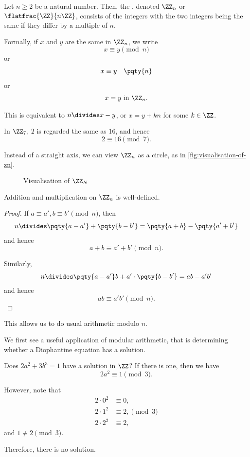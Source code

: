 \begin{definition}
    Let \(n \geq 2\) be a natural number. Then, the , denoted \(\ZZ_{n}\) or \(\flatfrac{\ZZ}{n\ZZ}\), consists of the integers with the two integers being the same if they differ by a multiple of \(n\).

    Formally, if \(x\) and \(y\) are the same in \(\ZZ_n\), we write
    \[
        x \equiv y \pmod{n}
    \]
    or
    \[
        x \equiv y \quad \pqty{n}
    \]
    or
    \[
        x = y \text{ in } \ZZ_n.
    \]

    This is equivalent to \(n \divides x - y\), or \(x = y + kn\) for some \(k \in \ZZ\).
\end{definition}

\begin{example}
    In \(\ZZ_7\), \(2\) is regarded the same as \(16\), and hence
    \[
        2 \equiv 16 \pmod 7.
    \]
\end{example}

Instead of a straight axis, we can view \(\ZZ_n\) as a circle, as in \autoref{fig:visualisation-of-zn}.

\begin{figure}[ht!]
    \centering
    \caption{Visualisation of \(\ZZ_N\)}
    \label{fig:visualisation-of-zn}
\end{figure}

\begin{proposition}
    Addition and multiplication on \(\ZZ_n\) is well-defined.
\end{proposition}

\begin{proof}
    If \(a \equiv a', b \equiv b' \pmod{n}\), then
    \[
        n \divides \pqty{a - a'} + \pqty{b - b'} = \pqty{a + b} - \pqty{a' + b'}
    \]
    and hence
    \[
        a + b \equiv a' + b' \pmod{n}.
    \]

    Similarly,
    \[
        n \divides \pqty{a - a'} b + a' \cdot \pqty{b - b'} = ab - a' b'
    \]
    and hence
    \[
        ab \equiv a' b' \pmod{n}.
    \]
\end{proof}

This allows us to do usual arithmetic modulo \(n\).

We first see a useful application of modular arithmetic, that is determining whether a Diophantine equation has a solution.

\begin{examples}
    Does \(2a^2 + 3b^3 = 1\) have a solution in \(\ZZ\)? If there is one, then we have
    \[
        2a^2 \equiv 1 \pmod{3}.
    \]

    However, note that
    \begin{align*}
        2 \cdot 0^2 &\equiv 0, \\
        2 \cdot 1^2 &\equiv 2, \pmod{3} \\
        2 \cdot 2^2 &\equiv 2,
    \end{align*}
    and \(1 \nequiv 2 \pmod{3}\).

    Therefore, there is no solution.
\end{examples}

